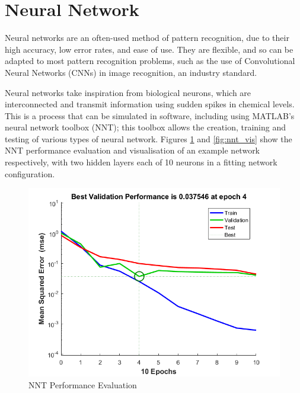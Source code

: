 \documentclass[a4paper, 10pt, conference]{ieeeconf}
\begin{document}
\section{Neural Network}


Neural networks are an often-used method of pattern recognition, due to their high accuracy, low error rates, and ease of use. They are flexible, and so can be adapted to most pattern recognition problems, such as the use of Convolutional Neural Networks (CNNs) in image recognition, an industry standard.

Neural networks take inspiration from biological neurons, which are interconnected and transmit information using sudden spikes in chemical levels. This is a process that can be simulated in software, including using MATLAB's neural network toolbox (NNT); this toolbox allows the creation, training and testing of various types of neural network. Figures \ref{fig:nnt_perf} and \ref{fig:nnt_vis} show the NNT performance evaluation and visualisation of an example network respectively, with two hidden layers each of 10 neurons in a fitting network configuration.

\begin{figure}[!ht]
    \centering
    \includegraphics[width=\linewidth]{pic/performance}
    \caption{NNT Performance Evaluation}
    \label{fig:nnt_perf}
\end{figure}
\end{document}
